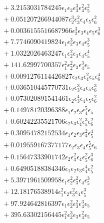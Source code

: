 \documentclass[10pt]{article}
\begin{document}
\begin{align*}
&{}  + 3.2153031784245 \epsilon_{1} \epsilon_{2} \epsilon_{3}^{3} \epsilon_{4}^{2} \epsilon_{5}^{2} \\
&{}  + 0.051207266944087 \epsilon_{2}^{3} \epsilon_{3}^{2} \epsilon_{4} \epsilon_{5} \epsilon_{6}^{2} \\
&{}  + 0.0036155516687966 \epsilon_{2}^{3} \epsilon_{3} \epsilon_{4} \epsilon_{5} \epsilon_{6}^{3} \\
&{}  + 7.7746090419824 \epsilon_{1} \epsilon_{2}^{3} \epsilon_{3} \epsilon_{4} \epsilon_{5}^{3} \\
&{}  + 1.0322026463247 \epsilon_{1} \epsilon_{2}^{2} \epsilon_{3} \epsilon_{4} \epsilon_{5}^{4} \\
&{}  + 141.62997700357 \epsilon_{1}^{2} \epsilon_{2}^{2} \epsilon_{3} \epsilon_{4}^{3} \epsilon_{5} \\
&{}  + 0.0091276114426827 \epsilon_{2} \epsilon_{3} \epsilon_{4}^{2} \epsilon_{5} \epsilon_{6}^{4} \\
&{}  + 0.036510445770731 \epsilon_{2} \epsilon_{3}^{3} \epsilon_{4} \epsilon_{5} \epsilon_{6}^{3} \\
&{}  + 0.073020891541461 \epsilon_{2} \epsilon_{3}^{4} \epsilon_{4} \epsilon_{5} \epsilon_{6}^{2} \\
&{}  + 0.14978120396388 \epsilon_{1} \epsilon_{2} \epsilon_{3} \epsilon_{4}^{5} \epsilon_{5} \\
&{}  + 0.60242235521706 \epsilon_{2} \epsilon_{3} \epsilon_{4}^{2} \epsilon_{5}^{3} \epsilon_{6}^{2} \\
&{}  + 0.30954782152534 \epsilon_{1} \epsilon_{2} \epsilon_{3} \epsilon_{4}^{2} \epsilon_{5}^{4} \\
&{}  + 0.019559167377177 \epsilon_{2} \epsilon_{3} \epsilon_{4} \epsilon_{5}^{5} \epsilon_{6} \\
&{}  + 0.15647333901742 \epsilon_{2} \epsilon_{3}^{2} \epsilon_{4} \epsilon_{5}^{2} \epsilon_{6}^{3} \\
&{}  + 0.64905188384346 \epsilon_{1} \epsilon_{2} \epsilon_{3} \epsilon_{4}^{4} \epsilon_{5}^{2} \\
&{}  + 5.3971961509958 \epsilon_{1} \epsilon_{2}^{2} \epsilon_{3}^{2} \epsilon_{4} \epsilon_{5}^{3} \\
&{}  + 12.18176538914 \epsilon_{1}^{2} \epsilon_{2} \epsilon_{3}^{2} \epsilon_{4} \epsilon_{5}^{3} \\
&{}  + 97.924642816397 \epsilon_{1} \epsilon_{2}^{2} \epsilon_{3}^{2} \epsilon_{4}^{3} \epsilon_{5} \\
&{}  + 395.63302156445 \epsilon_{1}^{2} \epsilon_{2}^{3} \epsilon_{3} \epsilon_{4}^{2} \epsilon_{5} \\

\end{align*}
\end{document}
